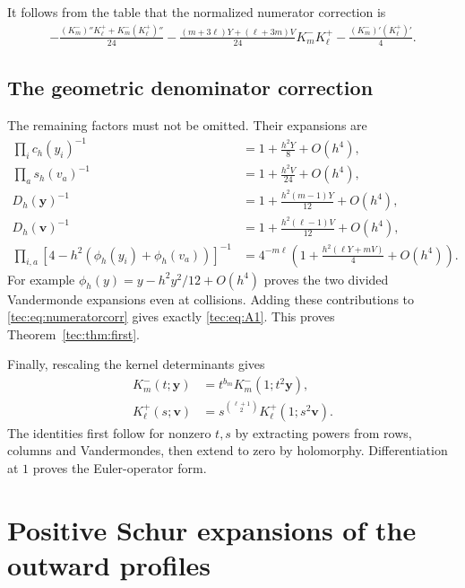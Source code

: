\documentclass[11pt,a4paper]{article}
\numberwithin{equation}{section}
\theoremstyle{definition}
\theoremstyle{remark}
\newcommand{\by}{\boldsymbol{y}}
\newcommand{\bv}{\boldsymbol v}
\begin{document}
It follows from the table that the normalized numerator correction is
\begin{align}\label{tec:eq:numeratorcorr}
 -\frac{(K_m^-)''K_\ell^++K_m^-(K_\ell^+)''}{24}
 -\frac{(m+3\ell)Y+(\ell+3m)V}{24}K_m^-K_\ell^+
 -\frac{(K_m^-)'(K_\ell^+)'}4.
\end{align}

\subsection{The geometric denominator correction}
The remaining factors must not be omitted. Their expansions are
\begin{align*}
 \prod_i c_h(y_i)^{-1}&=1+\frac{h^2Y}{8}+O(h^4),\\
 \prod_a s_h(v_a)^{-1}&=1+\frac{h^2V}{24}+O(h^4),\\
 D_h(\by)^{-1}&=1+\frac{h^2(m-1)Y}{12}+O(h^4),\\
 D_h(\bv)^{-1}&=1+\frac{h^2(\ell-1)V}{12}+O(h^4),\\
 \prod_{i,a}[4-h^2(\phi_h(y_i)+\phi_h(v_a))]^{-1}
 &=4^{-m\ell}\left(1+\frac{h^2(\ell Y+mV)}4+O(h^4)\right).
\end{align*}
For example $\phi_h(y)=y-h^2y^2/12+O(h^4)$ proves the two divided
Vandermonde expansions even at collisions. Adding these contributions
to \eqref{tec:eq:numeratorcorr} gives exactly \eqref{tec:eq:A1}.
This proves Theorem~\ref{tec:thm:first}.

Finally, rescaling the kernel determinants gives
\begin{align}\label{tec:eq:homogeneity}
 K_m^-(t;\by)&=t^{b_m}K_m^-(1;t^2\by),\\
 K_\ell^+(s;\bv)&=s^{\binom{\ell+1}{2}}K_\ell^+(1;s^2\bv).
\end{align}
The identities first follow for nonzero $t,s$ by extracting powers from
rows, columns and Vandermondes, then extend to zero by holomorphy.
Differentiation at $1$ proves the Euler-operator form.

\section{Positive Schur expansions of the outward profiles}\label{tec:sec:schur}
\end{document}
